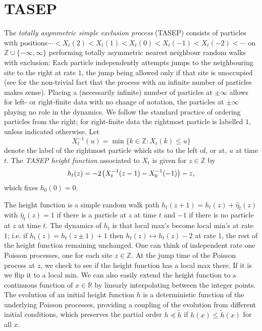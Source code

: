 \documentclass[letterpaper,reqno,11pt,oneside,final]{amsart}
\theoremstyle{definition}
\newcommand{\xx}{X}
\newcommand{\rr}{\mathbb{R}}
\newcommand{\zz}{\mathbb{Z}}
\newcommand{\tsm}{\hspace{-0.1em}}
\numberwithin{equation}{section}
\begin{document}
\section{TASEP} 
\label{sec:TASEP}

The \emph{totally asymmetric simple exclusion process} (TASEP) consists of particles with positions\linebreak $\cdots <\xx_t(2)<\xx_t(1)< \xx_t(0)< \xx_t(-1)<\xx_t(-2)< \cdots$
on $\zz\cup\{-\infty,\infty\}$ performing totally asymmetric nearest neighbour random walks with exclusion: Each particle independently attempts jumps to the neighbouring site to the right at rate $1$, the jump being allowed only if that site is unoccupied  (see \cite{ligg1} for the non-trivial fact that the process with an infinite number of particles makes sense).
Placing a (necessarily infinite) number of particles at $\pm\infty$ allows for left- or right-finite data with no change of notation, the particles at $\pm\infty$ playing no role in the dynamics.  
We follow the standard practice of ordering particles from the right; for right-finite data the rightmost particle is labelled $1$, unless indicated otherwise.
Let
\begin{equation}
\xx^{-1}_t(u) = \min \{k \in \zz : \xx_t(k) \leq u\}
\end{equation}
denote the label of the rightmost particle which sits to the left of, or at, $u$ at time $t$. 
The \emph{TASEP  height function} associated to $X_t$ is given for $z\in\zz$ by 
\begin{equation}\label{defofh}
 h_t(z) = -2\tsm\left(\xx_t^{-1}(z-1) - \xx_0^{-1}(-1) \right) - z,
\end{equation}  which fixes $h_0(0)=0$.

The height function is a simple random walk path $h_t(z+1) = h_t(z) +\hat{\eta}_t(z)$ with $\hat{\eta}_t(z)=1$ if there is a particle at $z$ at time $t$ and $-1$ if there is no particle at $z$ at time $t$.
The dynamics of $h_t$ is that local max's become local min's at rate $1$; i.e. if $h_t(z) = h_t(z\pm 1) +1$ then $h_t(z)\mapsto h_t(z)-2$ at rate $1$, the rest of the height function remaining unchanged.
One can think of independent rate one Poisson processes, one for each site $z\in \zz$.
At the jump time of the Poisson process at $z$, we check to see if the height function has a local max there.
If it is we flip it to a local min.
We can also easily extend the height function to a continuous function of $x\in \rr$ by linearly interpolating between the integer points. The evolution of an initial height function $h$ is a deterministic function of the underlying Poisson processes, providing a coupling of the evolution from different initial conditions, which preserves the partial order $h\preceq\tilde h$ if $h(x)\leq\tilde h(x)$ for all $x$.
\end{document}
